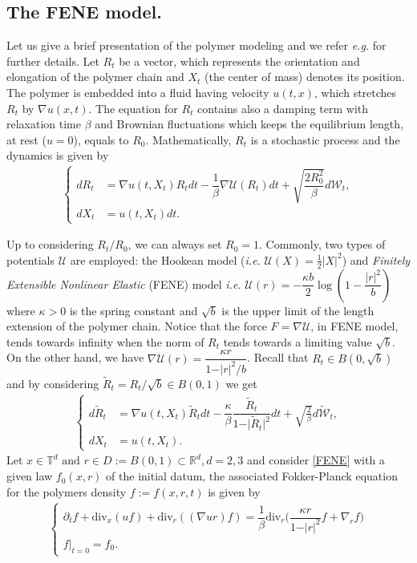 \documentclass[a4paper,12pt, reqno]{amsart}
\providecommand{\U}[1]{\protect\rule{.1in}{.1in}}
\renewcommand{\k}{\kappa}
\renewcommand{\U}{\mathcal{U}}
\newcommand{\Div}{\text{div}}
\begin{document}
\subsection{The FENE model.} Let us give a brief presentation of the polymer modeling and we refer  \textit{e.g.}  \cite[Section 4.2.]{BriTL09} for further details.
 Let   $R_t$  be a   vector, which  represents the orientation and elongation of  the polymer chain and   $X_t$ (the    center  of  mass) denotes its position. The polymer is embedded into a fluid having velocity $u(t,x)$, which stretches $R_t$ by $\nabla u(x,t)$. The equation for $R_t$ contains also a damping term with relaxation time $\beta$ and Brownian fluctuations which keeps the equilibrium length, at rest ($u=0$), equals to $R_0$. Mathematically, $R_t$ is a stochastic process and  the dynamics is given by 
  \begin{align}\label{2-1}
	\begin{cases}
	dR_t&=\nabla u(t,X_t) R_tdt-\dfrac{1}{\beta}\nabla \U(R_t)dt+\sqrt{\dfrac{2R_0^2}{\beta}}d\mathcal{W}_t, \\
	dX_t&=u(t,X_t)dt.
	\end{cases}
	\end{align}
   
   Up to considering $R_t/R_0$, we can always set $R_0=1$. 
		Commonly, two types of potentials $\U$ are employed: the Hookean model (\textit{i.e.} $\U(X)=\frac{1}{2}\vert X\vert^2$) and \textit{Finitely Extensible Nonlinear Elastic} (FENE) model \textit{i.e.} $\U(r)=-\dfrac{\k  b}{2} \log(1-\dfrac{\vert r\vert^2}{b})$ where $\k>0$ is the spring constant and  $\sqrt{b}$ is the upper limit of the length extension of the polymer chain. Notice that the force $F=\nabla\U$, in  FENE model, tends towards infinity when the norm of $R_t$ tends towards a limiting value $\sqrt{b}$. On the other hand, we have $ \nabla \U(r)=\dfrac{\k r}{1-\vert r\vert^2/b}$. 
         Recall that $R_t\in B(0,\sqrt{b})$ and by 
        considering  $\widetilde{R}_t=R_t/\sqrt{b} \in B(0,1) $ we get
\begin{align}\label{FENE}
	\begin{cases}
	d\widetilde{R}_t&=\nabla u(t,X_t) \widetilde{R}_tdt-\dfrac{\kappa}{\beta}\dfrac{\widetilde{R}_t}{1-\vert \widetilde{R}_t\vert^2}dt+\sqrt{\frac{2}{\beta}} d\widetilde{\mathcal{W}}_t, \\
	dX_t&=u(t,X_t).
	\end{cases}
	\end{align}
  Let   $ x\in \mathbb{T}^d \text{ and } r\in D:=B(0,1) \subset \mathbb{R}^d, d=2,3$ and 
consider	\eqref{FENE}
	with a given law $f_0 (x, r)$ of the initial datum,  the associated
	Fokker-Planck equation for the polymers density $f := f (x, r, t)$ is given by
	\begin{align*}
	\begin{cases}\partial_tf+\Div_x(uf)+\Div_r((\nabla u r)f)=\dfrac{1}{\beta}\Div_r \big(\dfrac{\k r}{1-\vert r\vert^2}f+	\nabla_rf\big)\\	
		f|_{t=0}=f_0.
			\end{cases}\end{align*}
            
\end{document}
